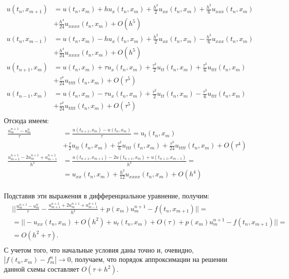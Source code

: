\documentclass[14pt,a4paper]{extarticle}
\newcommand{\1}{\mathbbm{1}}
\begin{document}
\begin{align*}
    u(t_n, x_{m+1}) &= u(t_n, x_{m}) +    h u_x(t_n, x_{m}) 
    + \frac{h^2}{2}u_{xx}(t_n, x_{m}) +    \frac{h^3}{6}u_{xxx}(t_n, x_{m}) \\ &+    \frac{h^4}{24}u_{xxxx}(t_n, x_{m}) + O(h^5) \\
    u(t_n, x_{m-1}) &= u(t_n, x_{m}) -    h u_x(t_n, x_{m}) 
    + \frac{h^2}{2}u_{xx}(t_n, x_{m}) -    \frac{h^3}{6}u_{xxx}(t_n, x_{m}) \\ &+    \frac{h^4}{24}u_{xxxx}(t_n, x_{m}) + O(h^5) \\
    u(t_{n+1}, x_m) &= u(t_{n}, x_m)+ \tau u_x(t_{n}, x_m) + \frac{\tau^2}{2}u_{tt}(t_n, x_{m}) + \frac{\tau^3}{6}u_{ttt}(t_n, x_{m}) \\
    &+ \frac{\tau^4}{24}u_{tttt}(t_n, x_{m}) + O(\tau^5) \\
    u(t_{n-1}, x_m) &= u(t_{n}, x_m)- \tau u_x(t_{n}, x_m) + \frac{\tau^2}{2}u_{tt}(t_n, x_{m}) - \frac{\tau^3}{6}u_{ttt}(t_n, x_{m}) \\
    &+ \frac{\tau^4}{24}u_{tttt}(t_n, x_{m}) + O(\tau^5) \\
\end{align*}
Отсюда имеем:
\begin{align*}
    \frac{u_m^{n+1} - u_m^n}{\tau} &=   \frac{u(t_{n+1}, x_m) - u(t_n, x_m)}{\tau} = u_t(t_{n}, x_m) \\
    &+\frac{\tau}{2}u_{tt}(t_n, x_{m}) + \frac{\tau^2}{6}u_{ttt}(t_n, x_{m}) + \frac{\tau^3}{24}u_{tttt}(t_n, x_{m}) + O(\tau^4) \\
    \frac{u_{m+1}^{n+1} - 2 u_{m}^{n+1} + u_{m-1}^{n+1}}{h^2} &= \frac{u(t_{n+1}, x_{m+1}) - 2 u(t_{n+1}, x_{m}) + u(t_{n+1}, x_{m-1})}{h^2} = \\
    &= u_{xx}(t_n, x_{m}) + \frac{h^2}{12}u_{xxxx}(t_n, x_{m}) + O(h^4)\\
\end{align*}

Подставив эти выражения в дифференциальное уравнение, получим:
\begin{align*}
    &||\frac{u_m^{n+1} - u_m^n}{\tau} - \frac{u_{m+1}^{n+1} + 2 u_{m}^{n+1} + u_{m-1}^{n+1}}{h^2} + p(x_m) u_m^{n+1} - f(t_{n}, x_{m+1})|| = \\
    &= ||- u_{xx}(t_n, x_{m}) + O(h^2) + u_t(t_{n}, x_m) + O(\tau) + p(x_m) u_m^{n+1} - f(t_{n}, x_{m+1}) || =\\
    &= O(h^2 + \tau). \\
\end{align*}
С учетом того, что начальные условия даны точно и, очевидно, $|f(t_n, x_m) - f_m^n| \rightarrow 0$, получаем, что порядок аппроксимации на решении 
данной схемы составляет $O(\tau + h^2)$.
\end{document}
